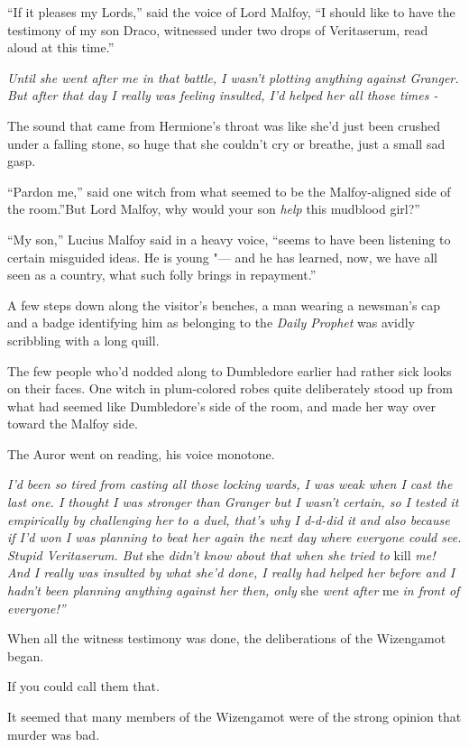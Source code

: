``If it pleases my Lords,'' said the voice of Lord Malfoy, ``I should
like to have the testimony of my son Draco, witnessed under two drops of
Veritaserum, read aloud at this time.''

\emph{Until she went after me in that battle, I wasn't plotting anything
against Granger. But after that day I really was feeling insulted, I'd
helped her all those times -}

The sound that came from Hermione's throat was like she'd just been
crushed under a falling stone, so huge that she couldn't cry or breathe,
just a small sad gasp.

``Pardon me,'' said one witch from what seemed to be the Malfoy-aligned
side of the room.''But Lord Malfoy, why would your son \emph{help} this
mudblood girl?''

``My son,'' Lucius Malfoy said in a heavy voice, ``seems to have been
listening to certain misguided ideas. He is young "--- and he has learned,
now, we have all seen as a country, what such folly brings in
repayment.''

A few steps down along the visitor's benches, a man wearing a newsman's
cap and a badge identifying him as belonging to the \emph{Daily Prophet}
was avidly scribbling with a long quill.

The few people who'd nodded along to Dumbledore earlier had rather sick
looks on their faces. One witch in plum-colored robes quite deliberately
stood up from what had seemed like Dumbledore's side of the room, and
made her way over toward the Malfoy side.

The Auror went on reading, his voice monotone.

\emph{I'd been so tired from casting all those locking wards, I was weak
when I cast the last one. I thought I was stronger than Granger but I
wasn't certain, so I tested it empirically by challenging her to a duel,
that's why I d-d-did it and also because if I'd won I was planning to
beat her again the next day where everyone could see. Stupid
Veritaserum. But} she \emph{didn't know about that when she tried to}
kill \emph{me! And I really was insulted by what she'd done, I really
had helped her before and I hadn't been planning anything against her
then, only} she \emph{went after} me \emph{in front of everyone!''}

When all the witness testimony was done, the deliberations of the
Wizengamot began.

If you could call them that.

It seemed that many members of the Wizengamot were of the strong opinion
that murder was bad.

